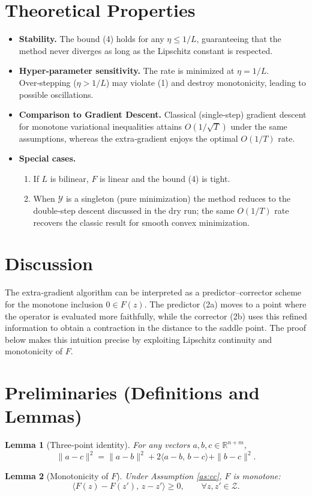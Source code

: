 \documentclass{article}
\newtheorem{lemma}{Lemma}
\begin{document}
\section*{Theoretical Properties}
\begin{itemize}
\item \textbf{Stability.} The bound (4) holds for any $\eta\le 1/L$, guaranteeing that the method never diverges as long as the Lipschitz constant is respected.
\item \textbf{Hyper‑parameter sensitivity.} The rate is minimized at $\eta=1/L$. Over‑stepping ($\eta>1/L$) may violate (1) and destroy monotonicity, leading to possible oscillations.
\item \textbf{Comparison to Gradient Descent.} Classical (single‑step) gradient descent for monotone variational inequalities attains $O(1/\sqrt{T})$ under the same assumptions, whereas the extra‑gradient enjoys the optimal $O(1/T)$ rate.
\item \textbf{Special cases.}
    \begin{enumerate}[label=(\alph*)]
    \item If $L$ is bilinear, $F$ is linear and the bound (4) is tight.
    \item When $\mathcal Y$ is a singleton (pure minimization) the method reduces to the double‑step descent discussed in the dry run; the same $O(1/T)$ rate recovers the classic result for smooth convex minimization.
    \end{enumerate}
\end{itemize}

\section*{Discussion}
The extra‑gradient algorithm can be interpreted as a predictor–corrector scheme for the monotone inclusion $0\in F(z)$. The predictor (2a) moves to a point where the operator is evaluated more faithfully, while the corrector (2b) uses this refined information to obtain a contraction in the distance to the saddle point. The proof below makes this intuition precise by exploiting Lipschitz continuity and monotonicity of $F$.

\section*{Preliminaries (Definitions and Lemmas)}
\begin{lemma}[Three‑point identity]\label{lem:three}
For any vectors $a,b,c\in\mathbb R^{n+m}$,
\[
\|a-c\|^{2}= \|a-b\|^{2}+2\langle a-b,\,b-c\rangle+\|b-c\|^{2}.
\]
\end{lemma}
\begin{lemma}[Monotonicity of $F$]\label{lem:mono}
Under Assumption \ref{as:cc}, $F$ is monotone:
\[
\langle F(z)-F(z'),\,z-z'\rangle\ge0,\qquad\forall z,z'\in\mathcal Z.
\]
\end{lemma}
\end{document}
